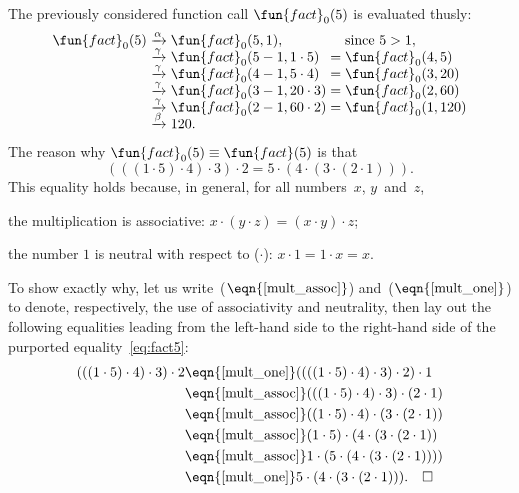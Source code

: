 The previously considered function call \(\fun{fact}_0(5)\) is
evaluated thusly:
\begin{equation*}
\begin{array}{r@{\;}c@{\;}l@{\;}c@{\;}l}
\fun{fact}_0(5)
& \xrightarrow{\smash[t]{\alpha}} & \fun{fact}_0(5,1),
&& \text{since \(5 > 1\)},\\
& \xrightarrow{\smash[t]{\gamma}} & \fun{fact}_0(5-1,1 \cdot 5)
& = & \fun{fact}_0(4,5)\\
& \xrightarrow{\smash[t]{\gamma}} & \fun{fact}_0(4-1,5 \cdot 4)
& = & \fun{fact}_0(3,20)\\
& \xrightarrow{\smash[t]{\gamma}} & \fun{fact}_0(3-1,20 \cdot 3)
& = & \fun{fact}_0(2,60)\\
& \xrightarrow{\smash[t]{\gamma}} & \fun{fact}_0(2-1,60 \cdot 2)
& = & \fun{fact}_0(1,120)\\
& \xrightarrow{\smash[t]{\beta}} & 120.
\end{array}
\end{equation*}
The reason why \(\fun{fact}_0(5) \equiv \fun{fact}(5)\) is that
\begin{equation}
  (((1 \cdot 5) \cdot 4) \cdot 3) \cdot 2
= 5 \cdot (4 \cdot (3 \cdot (2 \cdot 1))).\label{eq:fact5}
\end{equation}
This equality holds because, in general, for all numbers~\(x\),
\(y\)~and~\(z\),
\begin{enumerate*}

\item \label{mult_assoc} the multiplication is associative: \(x \cdot
  (y \cdot z) = (x \cdot y) \cdot z\);

\item \label{mult_one} the number \(1\) is neutral with respect to
  (\(\cdot\)): \(x \cdot 1 = 1 \cdot x = x\).

\end{enumerate*}
To show exactly why, let us write~(\(\eqn{\ref{mult_assoc}}\))
and~(\(\eqn{\ref{mult_one}}\)) to denote, respectively, the use of
associativity and neutrality, then lay out the following equalities
leading from the left\hyp{}hand side to the right\hyp{}hand side of
the purported equality~\eqref{eq:fact5}:
\begin{align*}
  (((1 \cdot 5) \cdot 4) \cdot 3) \cdot 2
  &\eqn{\smash{\ref{mult_one}}} ((((1 \cdot 5) \cdot 4) \cdot 3) \cdot
  2) \cdot 1\\
  &\eqn{\smash{\ref{mult_assoc}}} (((1 \cdot 5) \cdot 4) \cdot 3)
  \cdot (2 \cdot 1)\\
  &\eqn{\smash{\ref{mult_assoc}}} ((1 \cdot 5) \cdot 4) \cdot (3 \cdot (2
    \cdot 1))\\
  &\eqn{\smash{\ref{mult_assoc}}} (1 \cdot 5) \cdot (4 \cdot (3 \cdot
  (2 \cdot 1))\\
  &\eqn{\smash{\ref{mult_assoc}}} 1 \cdot (5 \cdot (4 \cdot (3 \cdot
  (2 \cdot 1))))\\
  &\eqn{\smash{\ref{mult_one}}} 5 \cdot (4 \cdot (3 \cdot (2 \cdot
  1))).\quad \Box
\end{align*}

